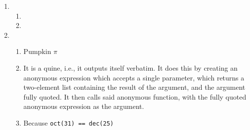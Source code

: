 \documentclass{article}
\begin{document}
\begin{enumerate}
\begin{enumerate}

\item{}

\item{}

\end{enumerate}

\item

\begin{enumerate}

\item{}

\item{}

\end{enumerate}

\item

\begin{enumerate}

\item{Pumpkin $\pi$}

\item{It is a quine, i.e., it outputs itself verbatim. It does this by creating
an anonymous expression which accepts a single parameter, which returns a
two-element list containing the result of the argument, and the argument fully
quoted. It then calls said anonymous function, with the fully quoted anonymous
expression as the argument.}

\item{Because \texttt{oct(31) == dec(25)}}

\end{enumerate}

\end{enumerate}
\end{document}

